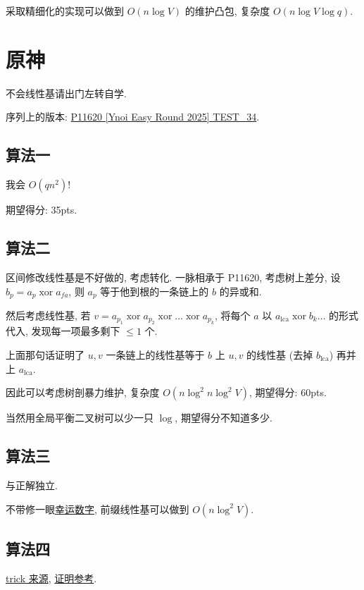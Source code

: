 \documentclass[a4paper, 12pt]{ctexart}
\begin{document}
采取精细化的实现可以做到 $O(n \log V)$ 的维护凸包, 复杂度 $O(n \log V \log q)$.

\section{原神}

不会线性基请出门左转自学.

序列上的版本: \href{https://www.luogu.com.cn/problem/P11620}{P11620 [Ynoi Easy Round 2025] TEST\_34}.

\subsection{算法一}

我会 $O(q n^2)$!

期望得分: 35pts.

\subsection{算法二}

区间修改线性基是不好做的, 考虑转化. 一脉相承于 P11620, 考虑树上差分, 设 $b_p = a_p \operatorname{xor} a_{fa}$, 
则 $a_p$ 等于他到根的一条链上的 $b$ 的异或和.

然后考虑线性基, 若 $v=a_{p_1}\operatorname{xor}a_{p_2}\operatorname{xor}\dots\operatorname{xor}a_{p_k}$, 将每个 $a$ 以 $a_{\operatorname{lca}} \operatorname{xor} b_k \dots$ 的形式代入, 发现每一项最多剩下 $\leq 1$ 个.

上面那句话证明了 $u, v$ 一条链上的线性基等于 $b$ 上 $u, v$ 的线性基 (去掉 $b_{\operatorname{lca}}$) 再并上 $a_{\operatorname{lca}}$.

因此可以考虑树剖暴力维护, 复杂度 $O(n \log^2 n \log^2 V)$, 期望得分: 60pts.

当然用全局平衡二叉树可以少一只 $\log$, 期望得分不知道多少.


\subsection{算法三}

与正解独立.

不带修一眼\href{https://www.luogu.com.cn/problem/P3292}{幸运数字}, 前缀线性基可以做到 $O(n \log^2 V)$.

\subsection{算法四}

\href{https://dl.ccf.org.cn/ppt/pptDetail.html?_ack=1&id=7456611705079808}{trick 来源}, 
\href{https://www.luogu.com/article/hyzcpypc}{证明参考}.
\end{document}
